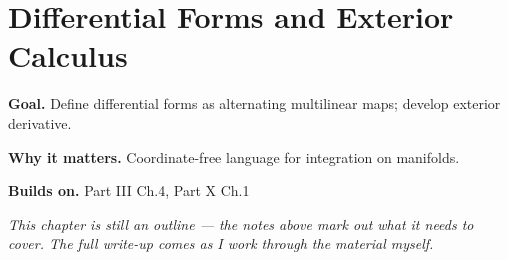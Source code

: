 \chapter{Differential Forms and Exterior Calculus}
\label{ch:10-differential-geometry-02}

\begin{chapterintro}
\textbf{Goal.} Define differential forms as alternating multilinear maps; develop exterior derivative.

\textbf{Why it matters.} Coordinate-free language for integration on manifolds.

\textbf{Builds on.} Part III Ch.4, Part X Ch.1
\end{chapterintro}

\textit{This chapter is still an outline --- the notes above mark out what it needs to cover. The full write-up comes as I work through the material myself.}
